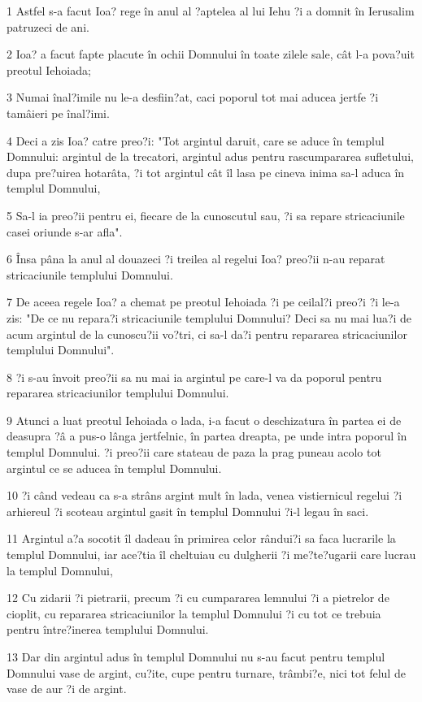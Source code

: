 \par 1 Astfel s-a facut Ioa? rege în anul al ?aptelea al lui Iehu ?i a domnit în Ierusalim patruzeci de ani.
\par 2 Ioa? a facut fapte placute în ochii Domnului în toate zilele sale, cât l-a pova?uit preotul Iehoiada;
\par 3 Numai înal?imile nu le-a desfiin?at, caci poporul tot mai aducea jertfe ?i tamâieri pe înal?imi.
\par 4 Deci a zis Ioa? catre preo?i: "Tot argintul daruit, care se aduce în templul Domnului: argintul de la trecatori, argintul adus pentru rascumpararea sufletului, dupa pre?uirea hotarâta, ?i tot argintul cât îl lasa pe cineva inima sa-l aduca în templul Domnului,
\par 5 Sa-l ia preo?ii pentru ei, fiecare de la cunoscutul sau, ?i sa repare stricaciunile casei oriunde s-ar afla".
\par 6 Însa pâna la anul al douazeci ?i treilea al regelui Ioa? preo?ii n-au reparat stricaciunile templului Domnului.
\par 7 De aceea regele Ioa? a chemat pe preotul Iehoiada ?i pe ceilal?i preo?i ?i le-a zis: "De ce nu repara?i stricaciunile templului Domnului? Deci sa nu mai lua?i de acum argintul de la cunoscu?ii vo?tri, ci sa-l da?i pentru repararea stricaciunilor templului Domnului".
\par 8 ?i s-au învoit preo?ii sa nu mai ia argintul pe care-l va da poporul pentru repararea stricaciunilor templului Domnului.
\par 9 Atunci a luat preotul Iehoiada o lada, i-a facut o deschizatura în partea ei de deasupra ?â a pus-o lânga jertfelnic, în partea dreapta, pe unde intra poporul în templul Domnului. ?i preo?ii care stateau de paza la prag puneau acolo tot argintul ce se aducea în templul Domnului.
\par 10 ?i când vedeau ca s-a strâns argint mult în lada, venea vistiernicul regelui ?i arhiereul ?i scoteau argintul gasit în templul Domnului ?i-l legau în saci.
\par 11 Argintul a?a socotit îl dadeau în primirea celor rândui?i sa faca lucrarile la templul Domnului, iar ace?tia îl cheltuiau cu dulgherii ?i me?te?ugarii care lucrau la templul Domnului,
\par 12 Cu zidarii ?i pietrarii, precum ?i cu cumpararea lemnului ?i a pietrelor de cioplit, cu repararea stricaciunilor la templul Domnului ?i cu tot ce trebuia pentru între?inerea templului Domnului.
\par 13 Dar din argintul adus în templul Domnului nu s-au facut pentru templul Domnului vase de argint, cu?ite, cupe pentru turnare, trâmbi?e, nici tot felul de vase de aur ?i de argint.
